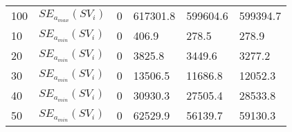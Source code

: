 \begin{table}[H]
\begin{tabular}{l l | l l | l l}
		100                                                         & $SE_{a_{max}}(SV_i)$                                                        & 0                                                                &    617301.8                                                              & 599604.6                                                         & 599394.7                                                                \\
		10                                                          & $SE_{a_{min}}(SV_i)$                                                      & 0                                                                &  406.9                                                                 & 278.5                                                            & 278.9                                                                   \\
		20                                                          & $SE_{a_{min}}(SV_i)$                                                      & 0                                                                &  3825.8                                                               & 3449.6                                                           & 3277.2                                                                  \\
		30                                                          & $SE_{a_{min}}(SV_i)$                                                      & 0                                                                &  13506.5                                                                   & 11686.8                                                          & 12052.3                                                                 \\
		40                                                          & $SE_{a_{min}}(SV_i)$                                                      & 0                                                                &   30930.3                                                              & 27505.4                                                          & 28533.8                                                                 \\
		50                                                          & $SE_{a_{min}}(SV_i)$                                                      & 0                                                                &  62529.9                                                               & 56139.7                                                          & 59130.3                                                                 \\

\end{tabular}
\end{table}
